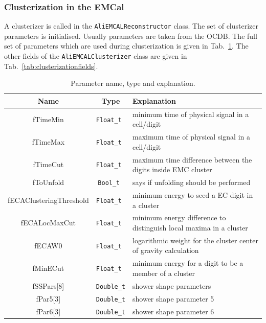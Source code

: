 \subsubsection{Clusterization in the EMCal}
A clusterizer is called in the \texttt{AliEMCALReconstructor} class. The set of clusterizer parameters is initialised. Usually parameters are taken from the OCDB. The full set of parameters which are used during clusterization is given in Tab.~\ref{tab:clusterizationparams}. The other fields of the \texttt{AliEMCALClusterizer} class are given in Tab.~\ref{tab:clusterizationfields}.
%
\begin{table}[!h]
\begin{center}
  \begin{tabular}{| c | c | l |}
  \hline
  Name & Type & Explanation \\ 
  \hline
   fTimeMin                & \texttt{Float\_t } & minimum time of physical signal in a cell/digit\\
   fTimeMax                & \texttt{Float\_t } & maximum time of physical signal in a cell/digit\\
   fTimeCut                & \texttt{Float\_t } & maximum time difference between the digits inside EMC cluster\\
   fToUnfold               & \texttt{Bool\_t  } & says if unfolding should be performed \\
   fECAClusteringThreshold & \texttt{Float\_t } & minimum energy to seed a EC digit in a cluster\\
   fECALocMaxCut           & \texttt{Float\_t } & minimum energy difference to distinguish local maxima in a cluster\\
   fECAW0                  & \texttt{Float\_t } & logarithmic weight for the cluster center of gravity calculation\\
   fMinECut                & \texttt{Float\_t } & minimum energy for a digit to be a member of a cluster\\
   fSSPars[8]              & \texttt{Double\_t} & shower shape parameters \\
   fPar5[3]                & \texttt{Double\_t} & shower shape parameter 5\\
   fPar6[3]                & \texttt{Double\_t} & shower shape parameter 6\\
  \hline
  \end{tabular}
\end{center}
\caption{Parameter name, type and explanation.}
\label{tab:clusterizationparams}
\end{table}
